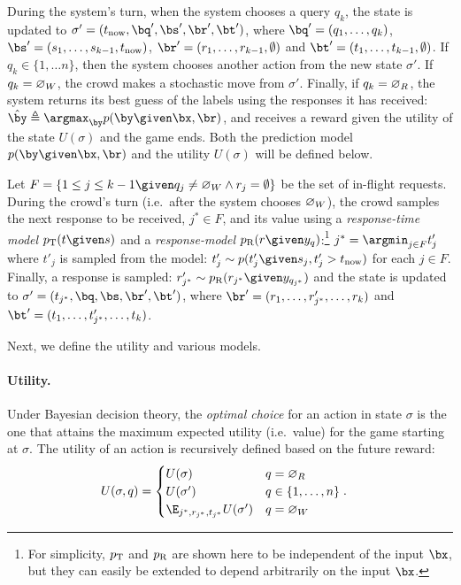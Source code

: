 During the system's turn,
when the system chooses a query $q_k$,
the state is updated to $\sigma' = (\now, \bq', \bs', \br', \bt')$, where $\bq' = (q_1, \ldots, q_k)$, $\bs' = (s_1, \ldots, s_{k-1}, \now)$, $\br' = (r_1, \ldots, r_{k-1}, \emptyset)$ and $\bt' = (t_1, \ldots, t_{k-1}, \emptyset)$.
If $q_k \in \{1, \ldots n\}$, then the system chooses another action from the new state $\sigma'$.
If $q_k = \varnothing_{W}$, the crowd makes a stochastic move from $\sigma'$.
Finally, if $q_k = \varnothing_{R}$, the system returns its best guess of the labels using the responses it has received:
$\hat\by \eqdef \argmax_{\by} p(\by \given \bx, \br)$,
and receives a reward given the utility of the state $U(\sigma)$ and the game ends. 
Both the prediction model $p(\by \given \bx, \br)$ and the utility $U(\sigma)$ will be defined below.

Let $F = \{1 \le j \le k-1 \given q_j \neq \acwait \wedge r_j = \emptyset \}$ be the set of in-flight requests.
During the crowd's turn (i.e.\ after the system chooses $\varnothing_{W}$), the crowd samples the next response to be received, $j^* \in F$, and its value using a \emph{response-time model} $\ptime(t \given s)$ and a \emph{response-model} $\presp(r \given y_q)$:\footnote{
For simplicity, $p_{\text{T}}$ and $p_{\text{R}}$ are shown here to be independent of the input $\bx$, but they can easily be extended to depend arbitrarily on the input $\bx$.\reword} 
$j^* = \argmin_{j \in F} t'_j$ where $t'_j$ is sampled from the model: $t'_j \sim p(t'_j \given s_j, t'_j > \now)$ for each $j \in F$. Finally, a response is sampled: $r'_{j^*} \sim \presp(r_{j^*} \given y_{q_{j^*}})$ and the state is updated to $\sigma' = (t_{j^*}, \bq, \bs, \br', \bt')$, where $\br' = (r_1, \ldots, r'_{j^*}, \ldots, r_k)$ and $\bt' = (t_1, \ldots, t'_{j^*}, \ldots, t_k)$.

Next, we define the utility and various models.

\paragraph{Utility.}
Under Bayesian decision theory, the \emph{optimal choice} for an action in state $\sigma$ is the one that attains the maximum expected utility (i.e.\ value) for the game starting at $\sigma$.
The utility of an action is recursively defined based on the future reward:
\begin{align*}
  U(\sigma, q) &= 
  \begin{cases}
    U(\sigma) & q = \acret \\
    U(\sigma') & q \in \{1, \ldots, n\} \\
    \E_{j^*, r_{j^*}, t_{j^*}} U(\sigma') & q = \acwait
  \end{cases}.
\end{align*}

